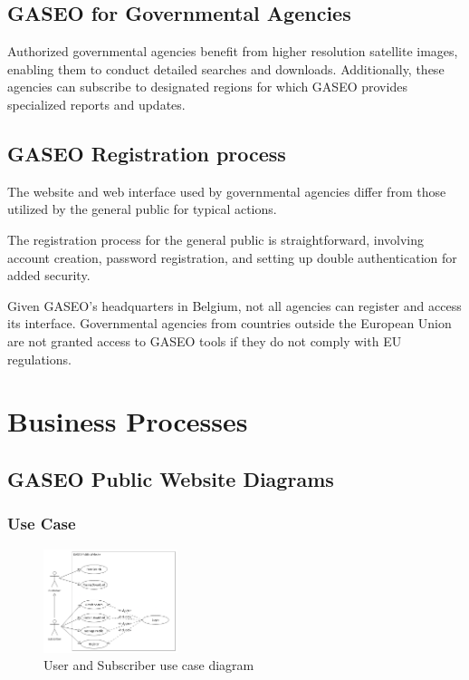 \documentclass[12pt]{article}
\begin{document}
\subsection{GASEO for Governmental Agencies}
Authorized governmental agencies benefit from higher resolution satellite images, enabling them to conduct detailed searches and downloads. Additionally, these agencies can subscribe to designated regions for which GASEO provides specialized reports and updates.

\subsection{GASEO Registration process}
The website and web interface used by governmental agencies differ from those utilized by the general public for typical actions. 

The registration process for the general public is straightforward, involving account creation, password registration, and setting up double authentication for added security.

Given GASEO's headquarters in Belgium, not all agencies can register and access its interface. 
Governmental agencies from countries outside the European Union are not granted access to GASEO tools if they do not comply with EU regulations. 

\newpage

\section{Business Processes}\label{Sec: Processes}

\subsection{GASEO Public Website Diagrams}
\subsubsection*{Use Case}

\begin{figure}[h]
    \centering
    \includegraphics[width=0.35\textwidth]{Figures/Business Processes/UseCase_1.png}
    \caption{User and Subscriber use case diagram}
\end{figure}
\end{document}
